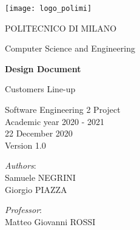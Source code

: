 \begin{titlingpage}
	\begin{center}
		\texttt{[image: logo\_polimi]}

		\vspace{0.25cm}

		\LARGE POLITECNICO DI MILANO\\

		\vspace{0.2cm}

		\Large Computer Science and Engineering

		\vspace{0.8cm}

		\Huge \textbf{Design Document}

		\vspace{0.5cm}
		\huge Customers Line-up

		\vspace{1.5cm}
		\LARGE Software Engineering 2 Project\\
		\Large Academic year 2020 - 2021\\
		\vspace{1cm}
		22 December 2020\\Version 1.0
		\vspace{3cm}

		\large
		\begin{minipage}{.1\textwidth}
			\null
		\end{minipage}%
		\begin{minipage}{.4\textwidth}
			\textit{Authors}:\\
			Samuele NEGRINI\\
			Giorgio PIAZZA
		\end{minipage}%
		\begin{minipage}{.4\textwidth}
			\raggedleft
			\textit{Professor}:\\
			Matteo Giovanni ROSSI\\
			\phantom{placeholder}
		\end{minipage}%
		\begin{minipage}{.1\textwidth}
			\null
		\end{minipage}


		\end{center}
\end{titlingpage}